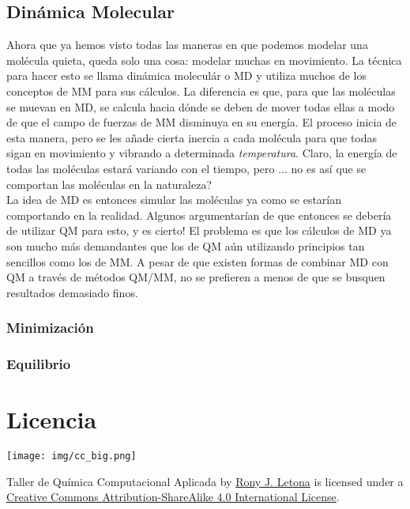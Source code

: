 \documentclass[10pt,letterpaper]{article}
\begin{document}
\subsection{Din\'amica Molecular}
Ahora que ya hemos visto todas las maneras en que podemos modelar una mol\'ecula quieta, queda solo una cosa: modelar muchas en movimiento. La t\'ecnica para hacer esto se llama din\'amica molecul\'ar o MD y utiliza muchos de los conceptos de MM para sus c\'alculos. La diferencia es que, para que las mol\'eculas se muevan en MD, se calcula hacia d\'onde se deben de mover todas ellas a modo de que el campo de fuerzas de MM disminuya en su energ\'ia. El proceso inicia de esta manera, pero se les a\~nade cierta inercia a cada mol\'ecula para que todas sigan en movimiento y vibrando a determinada \emph{temperatura}. Claro, la energ\'ia de todas las mol\'eculas estar\'a variando con el tiempo, pero ... no es as\'i que se comportan las mol\'eculas en la naturaleza?\\

La idea de MD es entonces simular las mol\'eculas ya como se estar\'ian comportando en la realidad. Algunos argumentar\'ian de que entonces se deber\'ia de utilizar QM para esto, y es cierto! El problema es que los c\'alculos de MD ya son mucho m\'as demandantes que los de QM a\'un utilizando principios tan sencillos como los de MM. A pesar de que existen formas de combinar MD con QM a trav\'es de m\'etodos QM/MM, no se prefieren a menos de que se busquen resultados demasiado finos.\\



\subsubsection{Minimizaci\'on}

\subsubsection{Equilibrio}

\section*{Licencia}

\noindent \texttt{[image: img/cc\_big.png]}

\noindent Taller de Qu\'imica Computacional Aplicada by \href{http://github.com/zronyj/TQCA}{Rony J. Letona} is licensed under a \href{http://creativecommons.org/licenses/by-sa/4.0/}{Creative Commons Attribution-ShareAlike 4.0 International License}.
\end{document}
